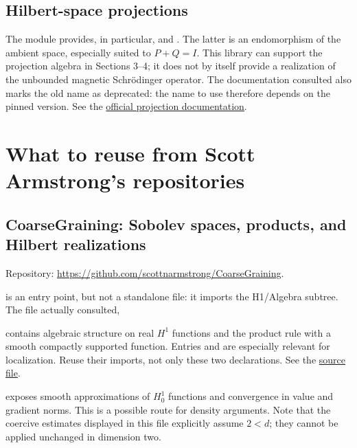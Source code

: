 \documentclass[11pt,a4paper]{article}
\newcommand{\code}[1]{\texttt{\detokenize{#1}}}
\begin{document}
\subsection{Hilbert-space projections}
The module 
provides, in particular,  and
. The latter is an endomorphism of the ambient
space, especially suited to $P+Q=I$. This library can support the projection
algebra in Sections 3--4; it does not by itself provide a realization of the
unbounded magnetic Schr\"odinger operator. The documentation consulted also
marks the old name \code{orthogonalProjection} as deprecated: the name to use
therefore depends on the pinned version. See the
\href{https://leanprover-community.github.io/mathlib4_docs/Mathlib/Analysis/InnerProductSpace/Projection/Basic.html}{official projection documentation}.

\section{What to reuse from Scott Armstrong's repositories}
\subsection{CoarseGraining: Sobolev spaces, products, and Hilbert realizations}
Repository: \url{https://github.com/scottnarmstrong/CoarseGraining}.

\href{https://github.com/scottnarmstrong/CoarseGraining/blob/main/Homogenization/Sobolev/H1.lean}{}
is an entry point, but not a standalone file: it imports the H1/Algebra
subtree. The file actually consulted,
\begin{center}\small{}\end{center}
contains algebraic structure on real $H^1$ functions and the product rule with
a smooth compactly supported function. Entries
 and
 are especially relevant for
localization. Reuse their imports, not only these two declarations. See the
\href{https://github.com/scottnarmstrong/CoarseGraining/blob/main/Homogenization/Sobolev/H1/Algebra/H1Function.lean}{source file}.

\href{https://github.com/scottnarmstrong/CoarseGraining/blob/main/Homogenization/Sobolev/Foundations/CoerciveH10.lean}{}
exposes smooth approximations of $H^1_0$ functions and convergence in value
and gradient norms. This is a possible route for density arguments. Note that
the coercive estimates displayed in this file explicitly assume $2<d$; they
cannot be applied unchanged in dimension two.
\end{document}
